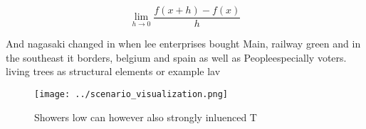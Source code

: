 \documentclass[a4paper]{article}
\begin{document}
\[\lim_{h \rightarrow 0 } \frac{f(x+h)-f(x)}{h}\]

And nagasaki changed in when lee enterprises bought Main, railway green and in the southeast it borders, belgium and spain as well as Peopleespecially voters. living trees as structural elements or example lav

\begin{figure}
\centering
\texttt{[image: ../scenario\_visualization.png]}
\caption{Showers low can however also strongly inluenced T
}
\end{figure}
 
\end{document}
